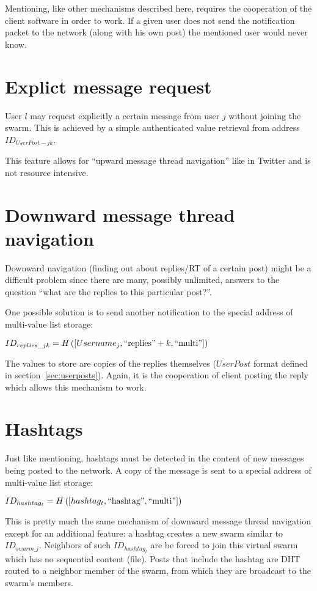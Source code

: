 \documentclass[a4paper,10pt]{article}
\begin{document}
Mentioning, like other mechanisms described here, requires the cooperation of the client software in order to work. If a given user does not send the notification packet to the network (along with his own post) the mentioned user would never know.

\section{Explict message request}

User $l$ may request explicitly a certain message from user $j$ without joining the swarm. This is achieved by a simple authenticated value retrieval from address $ID_{UserPost-jk}$.

This feature allows for ``upward message thread navigation'' like in Twitter and is not resource intensive.\label{sec:navigate_top}

\section{Downward message thread navigation}

Downward navigation (finding out about replies/RT of a certain post) might be a difficult problem since there are many, possibly unlimited, answers to the question ``what are the replies to this particular post?''.

One possible solution is to send another notification to the special address of multi-value list storage:

$ID_{replies\_jk} = H\left( [Username_j, \textnormal{``replies''}+k, \textnormal{``multi''}] \right)$

The values to store are copies of the replies themselves ($UserPost$ format defined in section~\ref{sec:userposts}). Again, it is the cooperation of client posting the reply which allows this mechanism to work.

\section{Hashtags}

Just like mentioning, hashtags must be detected in the content of new messages being posted to the network. A copy of the message is sent to a special address of multi-value list storage:

$ID_{hashtag_t} = H\left( [hashtag_t, \textnormal{``hashtag''},  \textnormal{``multi''}] \right)$

This is pretty much the same mechanism of downward message thread navigation except for an additional feature: a hashtag creates a new swarm similar to  $ID_{swarm\_j}$. Neighbors of such $ID_{hashtag_t}$ are be forced to join this virtual swarm which has no sequential content (file). Posts that include the hashtag are DHT routed to a neighbor member of the swarm, from which they are broadcast to the swarm's members.
\end{document}
